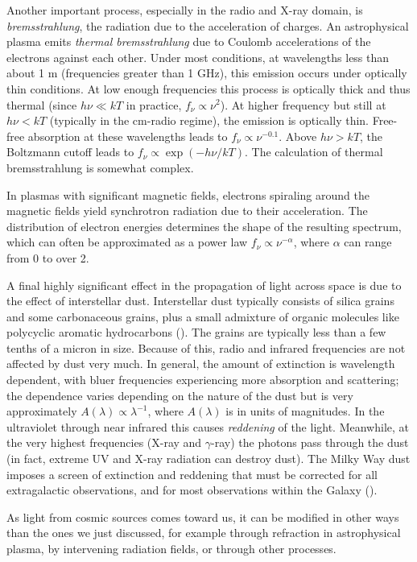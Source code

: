Another important process, especially in the radio and X-ray domain,
is {\it bremsstrahlung}, the radiation due to the acceleration of
charges. An astrophysical plasma emits {\it thermal bremsstrahlung}
due to Coulomb accelerations of the electrons against each
other. Under most conditions, at wavelengths less than about 1 m
(frequencies greater than 1 GHz), this emission occurs under optically
thin conditions. At low enough frequencies this process is optically
thick and thus thermal (since $h\nu \ll kT$ in practice,
$f_\nu\propto \nu^2$). At higher frequency but still at $h\nu < kT$
(typically in the cm-radio regime), the emission is optically
thin. Free-free absorption at these wavelengths leads to
$f_\nu\propto \nu^{-0.1}$. Above $h\nu> kT$, the Boltzmann cutoff
leads to $f_\nu\propto \exp(-h\nu/kT)$. The calculation of thermal
bremsstrahlung is somewhat complex.

In plasmas with significant magnetic fields, electrons spiraling
around the magnetic fields yield synchrotron radiation due to their
acceleration. The distribution of electron energies determines the
shape of the resulting spectrum, which can often be approximated as a
power law $f_\nu \propto \nu^{-\alpha}$, where $\alpha$ can range from
0 to over 2.

A final highly significant effect in the propagation of light across
space is due to the effect of interstellar dust. Interstellar dust
typically consists of silica grains and some carbonaceous grains, plus
a small admixture of organic molecules like polycyclic aromatic
hydrocarbons (\citealt{weingartner01a, draine03a}). The grains are
typically less than a few tenths of a micron in size. Because of this,
radio and infrared frequencies are not affected by dust very much. In
general, the amount of extinction is wavelength dependent, with bluer
frequencies experiencing more absorption and scattering; the
dependence varies depending on the nature of the dust but is very
approximately $A(\lambda) \propto \lambda^{-1}$, where $A(\lambda)$ is
in units of magnitudes. In the ultraviolet through near infrared this
causes {\it reddening} of the light. Meanwhile, at the very highest
frequencies (X-ray and $\gamma$-ray) the photons pass through the dust
(in fact, extreme UV and X-ray radiation can destroy dust). The Milky
Way dust imposes a screen of extinction and reddening that must be
corrected for all extragalactic observations, and for most
observations within the Galaxy (\citealt{schlegel98a}).

As light from cosmic sources comes toward us, it can be modified in
other ways than the ones we just discussed, for example through
refraction in astrophysical plasma, by intervening radiation fields,
or through other processes. 
  
